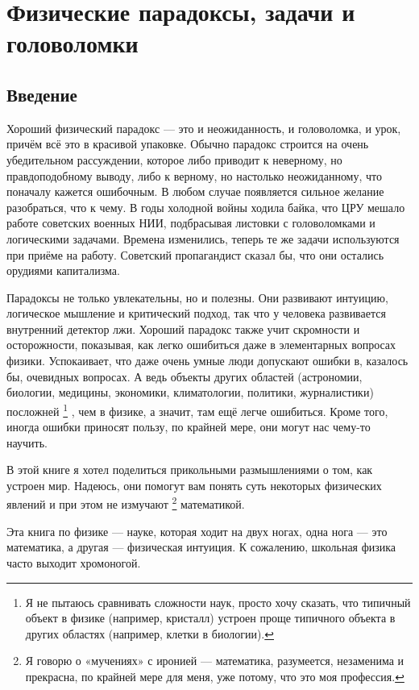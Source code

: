 \chapter[Парадоксы, задачи, головоломки]{Физические парадоксы, задачи и головоломки}

\section{Введение}

Хороший физический парадокс --- это и неожиданность, и головоломка, и урок, причём всё это в красивой упаковке.
Обычно парадокс строится на очень убедительном рассуждении, которое либо приводит к неверному, но правдоподобному выводу, либо к верному, но настолько неожиданному, что поначалу кажется ошибочным.
В любом случае появляется сильное желание разобраться, что к чему.
В годы холодной войны ходила байка, что ЦРУ мешало работе советских военных НИИ, подбрасывая листовки с головоломками и логическими задачами.
Времена изменились, теперь те же задачи используются при приёме на работу.
Советский пропагандист сказал бы, что они остались орудиями капитализма.

Парадоксы не только увлекательны, но и полезны.
Они развивают интуицию, логическое мышление и критический подход, так что у человека развивается внутренний детектор лжи.
Хороший парадокс также учит скромности и осторожности, показывая, как легко ошибиться даже в элементарных вопросах физики.
Успокаивает, что даже очень умные люди допускают ошибки в, казалось бы, очевидных вопросах.
А ведь объекты других областей (астрономии, биологии, медицины, экономики, климатологии, политики, журналистики) посложней%
\footnote{Я не пытаюсь сравнивать сложности наук, просто хочу сказать, что типичный объект в физике (например, кристалл) устроен проще типичного объекта в других областях (например, клетки в биологии).}%
, чем в физике, а значит, там ещё легче ошибиться.
Кроме того, иногда ошибки приносят пользу, по крайней мере, они могут нас чему-то научить.

В этой книге я хотел поделиться прикольными размышлениями о том, как устроен мир.
Надеюсь, они помогут вам понять суть некоторых физических явлений и при этом не измучают%
\footnote{Я говорю о «мучениях» с иронией --- математика, разумеется, незаменима и прекрасна, по крайней мере для меня, уже потому, что это моя профессия.}
математикой.

Эта книга по физике --- науке, которая ходит на двух ногах, одна нога --- это математика, а другая --- физическая интуиция.
К сожалению, школьная физика часто выходит хромоногой.

